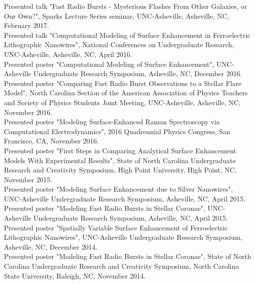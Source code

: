 \documentclass[letterpaper, 11pt]{article}
\newcommand{\noi}{\noindent}
\begin{document}
\noi Presented talk "Fast Radio Bursts - Mysterious Flashes From Other Galaxies, or Our Own?", Sparks Lecture Series seminar, UNC-Asheville, Asheville, NC, February 2017.
\\

\noi Presented talk "Computational Modeling of Surface Enhancement in Ferroelectric Lithographic Nanowires", National Conferences on Undergraduate Research, UNC-Asheville, Asheville, NC, April 2016.
\\

\noi Presented poster "Computational Modeling of Surface Enhancement", UNC-Asheville Undergraduate Research Symposium, Asheville, NC, December 2016.
\\

\noi Presented poster "Comparing Fast Radio Burst Observations to a Stellar Flare Model", North Carolina Section of the American Association of Physics Teachers and Society of Physics Students Joint Meeting, UNC-Asheville, Asheville, NC, November 2016.
\\

\noi Presented poster "Modeling Surface-Enhanced Raman Spectroscopy via Computational Electrodynamics", 2016 Quadrennial Physics Congress, San Francisco, CA, November 2016.
\\

\noi Presented poster "First Steps in Comparing Analytical Surface Enhancement Models With Experimental Results", State of North Carolina Undergraduate Research and Creativity Symposium, High Point University, High Point, NC, November 2015.
\\

\noi Presented poster "Modeling Surface Enhancement due to Silver Nanowires", UNC-Asheville Undergraduate Research Symposium, Asheville, NC, April 2015.
\\

\noi Presented poster "Modeling Fast Radio Bursts in Stellar Coronae", UNC-Asheville Undergraduate Research Symposium, Asheville, NC, April 2015.
\\

\noi Presented poster "Spatially Variable Surface Enhancement of
Ferroelectric Lithographic Nanowires", UNC-Asheville Undergraduate Research Symposium, Asheville, NC, December 2014.
\\

\noi Presented poster "Modeling Fast Radio Bursts in Stellar Coronae", State of North Carolina Undergraduate Research and Creativity Symposium, North Carolina State University, Raleigh, NC, November 2014.
\\
\end{document}
